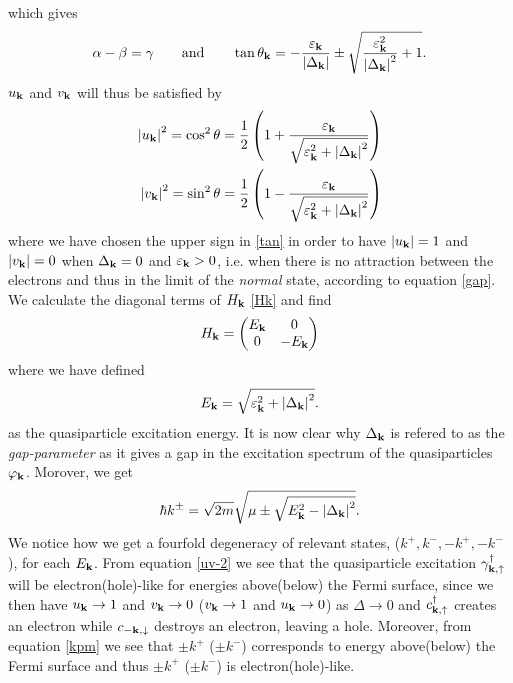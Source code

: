 which gives 
\begin{equation}
\alpha - \beta = \gamma
\qquad \mathrm{and} \qquad
\tan\theta_{\mathbf{k}} = -\frac{\varepsilon_{\mathbf{k}}}{\left|\Delta_{\mathbf{k}}\right|}\pm\sqrt{\frac{\varepsilon_{\mathbf{k}}^2}{\left|\Delta_{\mathbf{k}}\right|^2}+1}.
\label{tan}
\end{equation}
$u_{\mathbf{k}}$ and $v_{\mathbf{k}}$ will thus be satisfied by
\begin{equation}
\begin{split}
    \left|u_{\mathbf{k}}\right|^2 = \cos^2\theta = \frac{1}{2}\left(1 + \frac{\varepsilon_{\mathbf{k}}}{\sqrt{\varepsilon_{\mathbf{k}}^2 + \left|\Delta_{\mathbf{k}}\right|^2}}\right)    
    \\
    \left|v_{\mathbf{k}}\right|^2 = \sin^2\theta = \frac{1}{2}\left(1 - \frac{\varepsilon_{\mathbf{k}}}{\sqrt{\varepsilon_{\mathbf{k}}^2 + \left|\Delta_{\mathbf{k}}\right|^2}}\right)
\end{split}
\label{uv-2}
\end{equation}
where we have chosen the upper sign in \eqref{tan} in order to have $\left|u_{\mathbf{k}}\right| = 1$ and $\left|v_{\mathbf{k}}\right| = 0$ when $\Delta_{\mathbf{k}} = 0$ and $\varepsilon_{\mathbf{k}} > 0$, i.e. when there is no attraction between the electrons and thus in the limit of the \textit{normal} state, according to equation \eqref{gap}. We calculate the diagonal terms of $H_{\mathbf{k}}$ \eqref{Hk} and find
\begin{equation}
H_{\mathbf{k}} = 
\begin{pmatrix}
    E_{\mathbf{k}} & 0\\
    0 & -E_{\mathbf{k}}
\end{pmatrix}
\label{H_diag}
\end{equation}
where we have defined 
\begin{equation}
E_{\mathbf{k}} = \sqrt{\varepsilon_{\mathbf{k}}^2 + \left| \Delta_{\mathbf{k}} \right|^2}.
\label{Ek}
\end{equation}
as the quasiparticle excitation energy. It is now clear why $\Delta_{\mathbf{k}}$ is refered to as the \textit{gap-parameter} as it gives a gap in the excitation spectrum of the quasiparticles $\varphi_{\mathbf{k}}$. Morover, we get
\begin{equation}
    \hbar k^{\pm} = \sqrt{2m}\sqrt{\mu \pm \sqrt{E_{\mathbf{k}}^2-\left|\Delta_{\mathbf{k}}\right|^2}}.
\label{kpm}
\end{equation}
We notice how we get a fourfold degeneracy of relevant states, ($k^+,k^-,-k^+,-k^-$), for each $E_{\mathbf{k}}$. From equation \eqref{uv-2} we see that the quasiparticle excitation $\gamma_{\bf{k},\uparrow}^{\dagger}$ will be electron(hole)-like for energies above(below) the Fermi surface, since we then have $u_{\mathbf{k}} \rightarrow 1$ and $v_{\mathbf{k}} \rightarrow 0$ ($v_{\mathbf{k}} \rightarrow 1$ and $u_{\mathbf{k}} \rightarrow 0$) as $\Delta \rightarrow 0$ and $c_{\bf{k},\uparrow}^{\dagger}$ creates an electron while $c_{-\bf{k},\downarrow}$ destroys an electron, leaving a hole. Moreover, from equation \eqref{kpm} we see that $\pm k^+$ ($\pm k^-$) corresponds to energy above(below) the Fermi surface and thus $\pm k^+$ ($\pm k^-$) is electron(hole)-like. 
